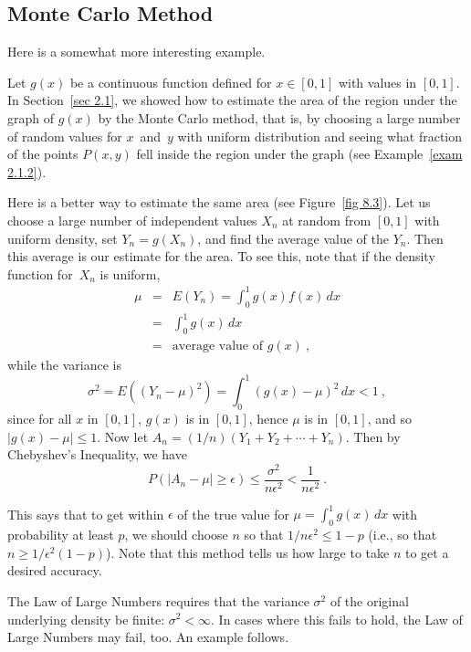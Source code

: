 {\subsection*{Monte Carlo Method}
Here is a somewhat more interesting example.

\begin{example}
Let $g(x)$ be a continuous function defined for $x \in [0,1]$ with values in
$[0,1]$.  In Section~\ref{sec 2.1}, we showed how to estimate the area of
the region under the graph of $g(x)$ by the Monte Carlo method, that is, by
choosing a large number of random values for $x$~and~$y$ with uniform
distribution and seeing what fraction of the points $P(x,y)$ fell inside the
region under the graph (see Example~\ref{exam 2.1.2}).
\par
Here is a better way to estimate the same area (see Figure~\ref{fig 8.3}).  Let us choose a
large number of independent values $X_n$ at random from $[0,1]$ with uniform
density, set $Y_n = g(X_n)$, and find the average value of the $Y_n$.  Then
this average is our estimate for the area.  To see this, note that if the
density function for~$X_n$ is uniform,
\begin{eqnarray*}
\mu & = & E(Y_n) = \int_0^1 g(x) f(x)\, dx \\
    & = & \int_0^1 g(x)\, dx \\
    & = & \mbox {average\ value\ of\ }  g(x)\ ,
\end{eqnarray*}
while the variance is
$$
\sigma^2 = E((Y_n - \mu)^2) = \int_0^1 (g(x) - \mu)^2\, dx < 1\ ,
$$
since for all $x$ in $[0, 1]$, $g(x)$ is in $[0, 1]$, hence $\mu$ is in $[0, 1]$, and
so $|g(x) - \mu| \le 1$.  Now let $A_n = (1/n)(Y_1 + Y_2 +\cdots+ Y_n)$.  Then by Chebyshev's
Inequality, we have
$$
P(|A_n - \mu| \geq \epsilon) \leq \frac {\sigma^2}{n\epsilon^2} < \frac
1{n\epsilon^2}\ .
$$


This says that to get within $\epsilon$ of the true value for $\mu = \int_0^1
g(x)\, dx$ with probability at least $p$, we should choose $n$ so that
$1/n\epsilon^2 \leq 1 - p$ (i.e., so that $n \geq 1/\epsilon^2(1 - p)$).  Note
that this method tells us how large to take $n$ to get a desired accuracy.
\end{example}

The Law of Large Numbers requires that the variance $\sigma^2$ of the original
underlying density be finite: $\sigma^2 < \infty$.  In cases where this fails
to hold, the Law of Large Numbers may fail, too.  An example follows.

}
